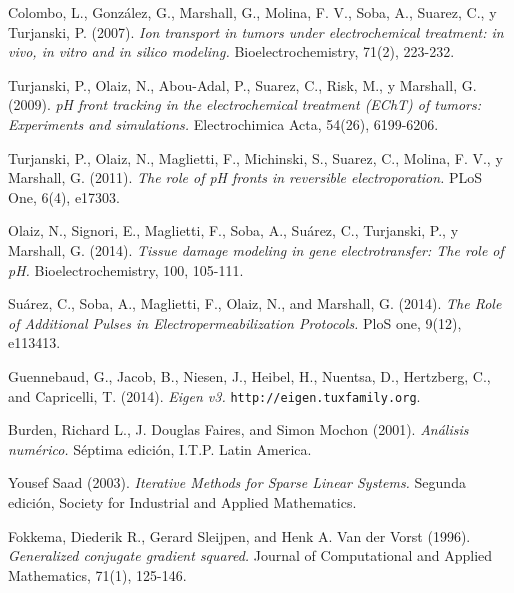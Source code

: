 \begin{thebibliography}{99}
	Colombo, L., González, G., Marshall, G., Molina, F. V., Soba, A., Suarez, C., y Turjanski, P. (2007). \emph{Ion transport in tumors under electrochemical treatment: in vivo, in vitro and in silico modeling.} Bioelectrochemistry, 71(2), 223-232.

	Turjanski, P., Olaiz, N., Abou-Adal, P., Suarez, C., Risk, M., y Marshall, G. (2009). \emph{pH front tracking in the electrochemical treatment (EChT) of tumors: Experiments and simulations.} Electrochimica Acta, 54(26), 6199-6206.


	Turjanski, P., Olaiz, N., Maglietti, F., Michinski, S., Suarez, C., Molina, F. V., y Marshall, G. (2011). \emph{The role of pH fronts in reversible electroporation.} PLoS One, 6(4), e17303.

	Olaiz, N., Signori, E., Maglietti, F., Soba, A., Suárez, C., Turjanski, P., y Marshall, G. (2014). \emph{Tissue damage modeling in gene electrotransfer: The role of pH.} Bioelectrochemistry, 100, 105-111.

	Suárez, C., Soba, A., Maglietti, F., Olaiz, N., and Marshall, G. (2014). \emph{The Role of Additional Pulses in Electropermeabilization Protocols.} PloS one, 9(12), e113413.	
	
	Guennebaud, G., Jacob, B., Niesen, J., Heibel, H., Nuentsa, D., Hertzberg, C., and Capricelli, T. (2014). \emph{Eigen v3.} \texttt{http://eigen.tuxfamily.org}.
	
	Burden, Richard L., J. Douglas Faires, and Simon Mochon (2001). \emph{Análisis numérico.} Séptima edición, I.T.P. Latin America.

	Yousef Saad (2003). \emph{Iterative Methods for Sparse Linear Systems.}	Segunda edición, Society for Industrial and Applied Mathematics.

	Fokkema, Diederik R., Gerard Sleijpen, and Henk A. Van der Vorst (1996). \emph{Generalized conjugate gradient squared.} Journal of Computational and Applied Mathematics, 71(1), 125-146.


\end{thebibliography}
